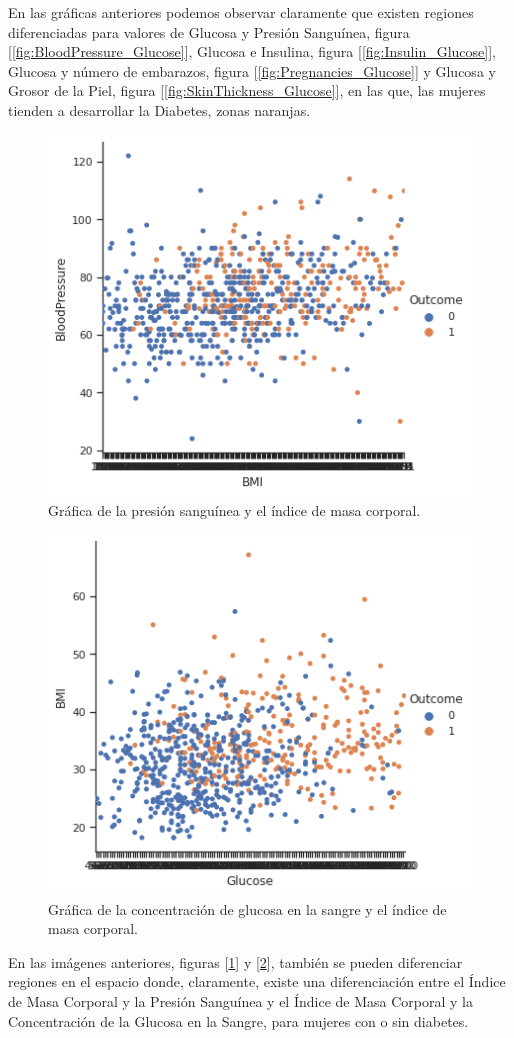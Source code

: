 \documentclass{article}
\begin{document}
En las gráficas anteriores podemos observar claramente que existen regiones diferenciadas para valores de Glucosa y Presión Sanguínea, figura [\ref{fig:BloodPressure_Glucose}], Glucosa e Insulina, figura [\ref{fig:Insulin_Glucose}], Glucosa y número de embarazos, figura [\ref{fig:Pregnancies_Glucose}] y Glucosa y Grosor de la Piel, figura [\ref{fig:SkinThickness_Glucose}], en las que, las mujeres tienden a desarrollar la Diabetes, zonas naranjas.

\begin{figure}[H]
	\centering
	\includegraphics[width=0.65\linewidth]{BloodPressure_BMI.png}
	\caption{Gráfica de la presión sanguínea y el índice de masa corporal.}%
	\label{fig:BloodPressure_BMI}
\end{figure}

\begin{figure}[H]
	\centering
	\includegraphics[width=0.65\linewidth]{BMI_Glucose.png}
	\caption{Gráfica de la concentración de glucosa en la sangre y el índice de masa corporal.}%
	\label{fig:BMI_Glucose}
\end{figure}

En las imágenes anteriores, figuras [\ref{fig:BloodPressure_BMI}] y [\ref{fig:BMI_Glucose}], también se pueden diferenciar regiones en el espacio donde, claramente, existe una diferenciación entre el Índice de Masa Corporal y la Presión Sanguínea y el Índice de Masa Corporal y la Concentración de la Glucosa en la Sangre, para mujeres con o sin diabetes.
\end{document}
